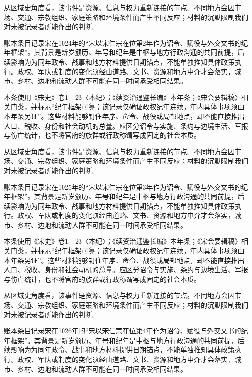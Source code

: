 从区域史角度看，该事件是资源、信息与权力重新连接的节点。不同地方会因市场、交通、宗教组织、家庭策略和环境条件而产生不同反应；材料的沉默限制我们对未被记录者所能作出的判断。

账本条目记录宋在1024年的“宋以宋仁宗在位第2年作为诏令、赋役与外交文书的纪年框架”。其背景是新岁颁历、年号和纪年是中枢与地方行政沟通的共同前提，后续影响为为同年政令、战事和地方材料提供日期锚点，不能单独推知具体政策执行。政权、军队或制度的变化须经由道路、文书、资源和地方中介才会落实，城市、乡村、边地和流动人群不可能在同一时间承受相同结果。

本条使用《宋史》卷1—23〈本纪〉；《续资治通鉴长编》本年条；《宋会要辑稿》相关门类，并标示“纪年框架可靠；该记录仅确证政权纪年连续，年内具体事项须由本年条另证”。这些材料能够钉住年序、命令、战役或局部地点，却不能直接推出人口、税收、身份和社会动机的总量。应区分诏令与实施、条约与边境生活、军报与伤亡统计，也不将官府的族群或行政称谓写成固定的社会本质。

从区域史角度看，该事件是资源、信息与权力重新连接的节点。不同地方会因市场、交通、宗教组织、家庭策略和环境条件而产生不同反应；材料的沉默限制我们对未被记录者所能作出的判断。

账本条目记录宋在1025年的“宋以宋仁宗在位第3年作为诏令、赋役与外交文书的纪年框架”。其背景是新岁颁历、年号和纪年是中枢与地方行政沟通的共同前提，后续影响为为同年政令、战事和地方材料提供日期锚点，不能单独推知具体政策执行。政权、军队或制度的变化须经由道路、文书、资源和地方中介才会落实，城市、乡村、边地和流动人群不可能在同一时间承受相同结果。

本条使用《宋史》卷1—23〈本纪〉；《续资治通鉴长编》本年条；《宋会要辑稿》相关门类，并标示“纪年框架可靠；该记录仅确证政权纪年连续，年内具体事项须由本年条另证”。这些材料能够钉住年序、命令、战役或局部地点，却不能直接推出人口、税收、身份和社会动机的总量。应区分诏令与实施、条约与边境生活、军报与伤亡统计，也不将官府的族群或行政称谓写成固定的社会本质。

从区域史角度看，该事件是资源、信息与权力重新连接的节点。不同地方会因市场、交通、宗教组织、家庭策略和环境条件而产生不同反应；材料的沉默限制我们对未被记录者所能作出的判断。

账本条目记录宋在1026年的“宋以宋仁宗在位第4年作为诏令、赋役与外交文书的纪年框架”。其背景是新岁颁历、年号和纪年是中枢与地方行政沟通的共同前提，后续影响为为同年政令、战事和地方材料提供日期锚点，不能单独推知具体政策执行。政权、军队或制度的变化须经由道路、文书、资源和地方中介才会落实，城市、乡村、边地和流动人群不可能在同一时间承受相同结果。

